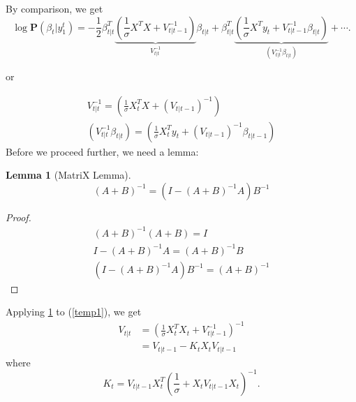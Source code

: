 \documentclass{article}
\numberwithin{algorithm}{section}
\theoremstyle{plain}
\newtheorem{lem}[thm]{Lemma}
\theoremstyle{definition}
\theoremstyle{remark}
\newcommand{\PP}{\mathbf{P}}
\begin{document}
By comparison, we get
\begin{equation}
\log \PP(\beta_t |  y^t_1) = - \frac12\beta^T_{t|t} \underbrace{ (\frac1\sigma X^T X + V_{t|t-1}^{-1})}_{V_{t|t}^{-1}} \beta_{t|t} + \beta^T_{t|t} \underbrace{( \frac1\sigma X^T y_t + V_{t|t-1}^{-1} \beta_{t|t})}_{ (V_{t|t} ^{-1} \beta_{t|t})} + \cdots.
\end{equation}

or

\begin{eqnarray}
 V_{t|t} ^{-1}  =  (\frac1\sigma X_t^T X + (V_{t|t-1})^{-1}) \label{temp1}\\
 (V_{t|t} ^{-1} \beta_{t|t}) = ( \frac1\sigma X_t^T y_t + (V_{t|t-1})^{-1} \beta_{t|t-1})
\end{eqnarray}
Before we proceed further, we need a lemma:
\begin{lem}[MatriX Lemma]
\begin{equation}
(A+B)^{-1} = (I - (A+B)^{-1} A)B^{-1}
\end{equation}
\label{ml}
\end{lem}
\begin{proof}
\begin{eqnarray*}
(A+B)^{-1}(A+B) = I\\
I - (A+B)^{-1} A = (A+B)^{-1} B\\
(I- (A+B)^{-1} A) B^{-1} = (A+B)^{-1}
\end{eqnarray*}
\end{proof}

Applying \ref{ml} to (\ref{temp1}), we get
\begin{equation}
\begin{split}
V_{t|t} &= ( \frac1\sigma X_t^T X_t + V_{t|t-1}^{-1})^{-1}\\
&=  V_{t|t-1} - K_t X_t V_{t|t-1}
\end{split}
\end{equation}
where
\[
K_t = V_{t|t-1} X_t^T (\frac1\sigma + X_t V_{t|t-1} X_t )^{-1}.
\]
\end{document}
